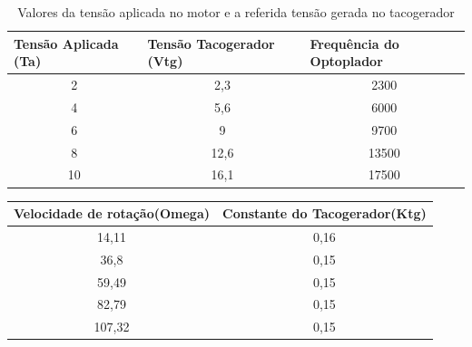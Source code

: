 \documentclass[11pt, a4paper, oneside]{article}
\begin{document}
\begin{table}[h!]
\centering
\caption{Valores da tensão aplicada no motor e a referida tensão gerada no tacogerador}
\label{Tabela1}
\begin{tabular}{@{}|c|c|c|@{}}
\toprule
\multicolumn{1}{|l|}{Tensão Aplicada (Ta)} & \multicolumn{1}{l|}{Tensão Tacogerador (Vtg)} & \multicolumn{1}{l|}{Frequência do Optoplador} \\ \midrule
2                                          & 2,3                                           & 2300                                          \\ \midrule
4                                          & 5,6                                           & 6000                                          \\ \midrule
6                                          & 9                                             & 9700                                          \\ \midrule
8                                          & 12,6                                          & 13500                                         \\ \midrule
10                                         & 16,1                                          & 17500                                         \\ \bottomrule
\end{tabular}
\end{table}


\begin{table}[h!]
\centering
\begin{tabular}{@{}|c|c|@{}}
\toprule
\multicolumn{1}{|l|}{Velocidade de rotação(Omega)} & \multicolumn{1}{l|}{Constante do Tacogerador(Ktg)} \\ \midrule
14,11                                       & 0,16                                          \\ \midrule
36,8                                        & 0,15                                          \\ \midrule
59,49                                       & 0,15                                          \\ \midrule
82,79                                       & 0,15                                          \\ \midrule
107,32                                      & 0,15                                          \\ \bottomrule
\end{tabular}
\end{table}
\end{document}
